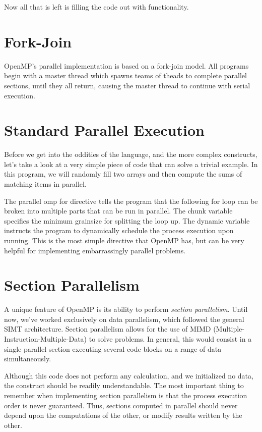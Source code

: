 \documentclass{article}
\newcommand{\comp}[1]{{\ttfamily #1}}
\begin{document}
	
	
	Now all that is left is filling the code out with functionality.
	
	\section{Fork-Join}
	OpenMP's parallel implementation is based on a fork-join model. All programs begin with a master thread which spawns teams of theads to complete parallel sections, until they all return, causing the master thread to continue with serial execution.
	
	\section{Standard Parallel Execution}
	Before we get into the oddities of the language, and the more complex constructs, let's take a look at a very simple piece of code that can solve a trivial example. In this program, we will randomly fill two arrays and then compute the sums of matching items in parallel.
	 
	
	The \comp{parallel omp for} directive tells the program that the following \comp{for} loop can be broken into multiple parts that can be run in parallel. The \comp{chunk} variable specifies the minimum grainsize for splitting the loop up. The \comp{dynamic} variable instructs the program to dynamically schedule the process execution upon running. This is the most simple directive that OpenMP has, but can be very helpful for implementing embarrassingly parallel problems.
	
	\section{Section Parallelism}
	A unique feature of OpenMP is its ability to perform \emph{section parallelism}. Until now, we've worked exclusively on data parallelism, which followed the general SIMT architecture. Section parallelism allows for the use of MIMD (Multiple-Instruction-Multiple-Data) to solve problems. In general, this would consist in a single parallel section executing several code blocks on a range of data simultaneously. 
	
		
	
	Although this code does not perform any calculation, and we initialized no data, the construct should be readily understandable. The most important thing to remember when implementing section parallelism is that the process execution order is never guaranteed. Thus, sections computed in parallel should never depend upon the computations of the other, or modify results written by the other.     
\end{document}
